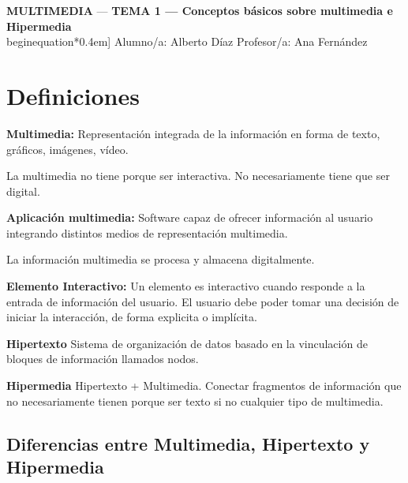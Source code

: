 \documentclass[11pt,a4paper]{article}
\newcommand{\asignatura}{MULTIMEDIA}
\newcommand{\tema}{TEMA 1 — Conceptos básicos sobre multimedia e Hipermedia}  %
\begin{document}
	{\large \textbf{\asignatura} \;—\; \textbf{\tema} \hfill}\\begin{equation*}0.4em]
	\faUser\; Alumno/a: Alberto Díaz\hfill
	\faChalkboardTeacher\; Profesor/a: Ana Fernández

	\vspace{0.6em}

	\tableofcontents

	\section{Definiciones}
	\begin{DefBox}
		\textbf{Multimedia:} Representación integrada de la información en forma de texto, gráficos, imágenes, vídeo.

		La multimedia no tiene porque ser interactiva. No necesariamente tiene que ser digital.
	\end{DefBox}



	\begin{DefBox}
		\textbf{Aplicación multimedia:} Software capaz de ofrecer información al usuario integrando distintos medios de representación multimedia.

		La información multimedia se procesa y almacena digitalmente.
	\end{DefBox}

	\begin{DefBox}
		\textbf{Elemento Interactivo: } Un elemento es interactivo cuando responde a la entrada de información del usuario. El usuario debe poder tomar una decisión de iniciar la interacción, de forma explicita o implícita.
	\end{DefBox}

	\begin{DefBox}
		\textbf{Hipertexto} Sistema de organización de datos basado en la vinculación de bloques de información llamados nodos.
	\end{DefBox}

	\begin{DefBox}
		\textbf{Hipermedia} Hipertexto + Multimedia. Conectar fragmentos de información que no necesariamente tienen porque ser texto si no cualquier tipo de multimedia.
	\end{DefBox}

	\subsection{Diferencias entre Multimedia, Hipertexto y Hipermedia}
\end{document}
